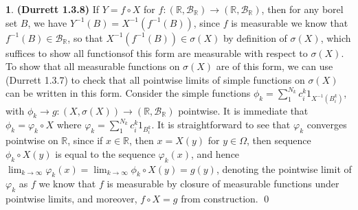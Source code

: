 \documentclass[10.5pt]{article}
\theoremstyle{definition}
\newtheorem{pb}{}
\begin{document}
    \begin{pb} \textbf{(Durrett 1.3.8)}
        If \(Y = f\circ X\) for \(f: (\mathbb{R},\mathcal{B}_\mathbb{R}) \to (\mathbb{R},\mathcal{B}_\mathbb{R})\), then for any borel set \(B\), we have \(Y^{-1}(B) = X^{-1}(f^{-1}(B))\), since \(f\) is measurable we know that \(f^{-1}(B) \in \mathcal{B}_\mathbb{R}\), so that \(X^{-1}(f^{-1}(B)) \in \sigma(X)\) by definition of \(\sigma(X)\), which suffices to show all functionsof this form are measurable with respect to \(\sigma(X)\). To show that all measurable functions on \(\sigma(X)\) are of this form, we can use (Durrett 1.3.7) to check that all pointwise limits of simple functions on \(\sigma(X)\) can be written in this form. Consider the simple functions \(\phi_k = \sum_1^{N_k} c^k_i 1_{X^{-1}(B^k_i)}\), with \(\phi_k \to g: (X,\sigma(X)) \to (\mathbb{R},\mathcal{B}_\mathbb{R})\) pointwise. It is immediate that \(\phi_k = \varphi_k\circ X\) where \(\varphi_k = \sum_1^{N_k}c^k_i 1_{B_i^k}\). It is straightforward to see that \(\varphi_k\) converges pointwise on \(\mathbb{R}\), since if \(x \in \mathbb{R}\), then \(x = X(y)\) for \(y \in \Omega\), then sequence \(\phi_k\circ X (y)\) is equal to the sequence \(\varphi_k (x)\), and hence \(\lim_{k\to\infty}\varphi_k(x) = \lim_{k\to\infty}\phi_k\circ X (y) = g(y)\), denoting the pointwise limit of \(\varphi_k\) as \(f\) we know that \(f\) is measurable by closure of measurable functions under pointwise limits, and moreover, \(f \circ X = g\) from construction. \qed
    \end{pb}
\end{document}

